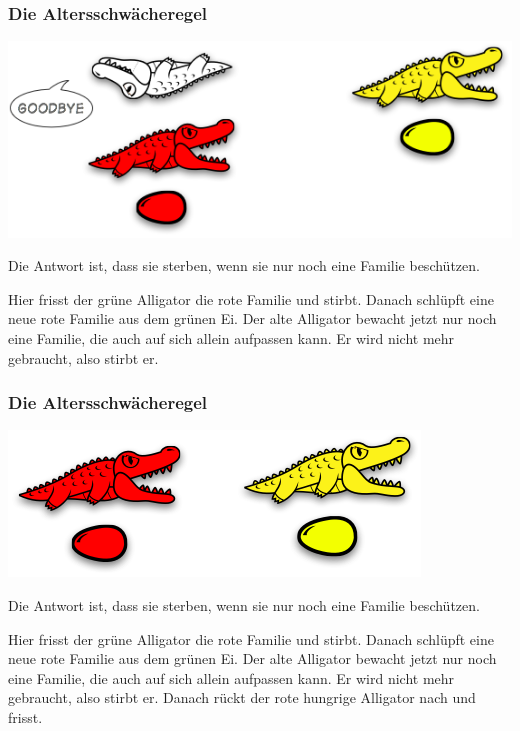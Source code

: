 \documentclass{beamer}
\begin{document}

\begin{frame}
\frametitle{Die Altersschwächeregel}

\begin{center}
\includegraphics[scale=0.35]{old_3.png} 
\end{center}

Die Antwort ist, dass sie sterben, wenn sie nur noch eine Familie beschützen.\bigskip

Hier frisst der grüne Alligator die rote Familie und stirbt. Danach schlüpft eine neue rote Familie aus dem grünen Ei. Der alte Alligator bewacht jetzt nur noch eine Familie, die auch auf sich allein aufpassen kann. Er wird nicht mehr gebraucht, also stirbt er.

\end{frame}


\begin{frame}
\frametitle{Die Altersschwächeregel}

\begin{center}
\includegraphics[scale=0.35]{old_4.png} 
\end{center}

Die Antwort ist, dass sie sterben, wenn sie nur noch eine Familie beschützen.\bigskip

Hier frisst der grüne Alligator die rote Familie und stirbt. Danach schlüpft eine neue rote Familie aus dem grünen Ei. Der alte Alligator bewacht jetzt nur noch eine Familie, die auch auf sich allein aufpassen kann. Er wird nicht mehr gebraucht, also stirbt er.
Danach rückt der rote hungrige Alligator nach und frisst.

\end{frame}
\end{document}
